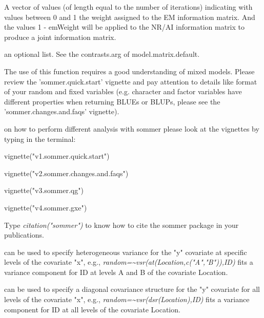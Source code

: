 \documentclass[a4paper]{book}
\begin{document}
\begin{Arguments}
\begin{ldescription}
\item[\code{emWeight}] A vector of values (of length equal to the number of iterations) indicating with values between 0 and 1 the weight assigned to the EM information matrix. And the values 1 - emWeight will be applied to the NR/AI information matrix to produce a joint information matrix.
\item[\code{contrasts}] an optional list. See the contrasts.arg of model.matrix.default.

\end{ldescription}
\end{Arguments}
%
\begin{Details}\relax

The use of this function requires a good understanding of mixed models. Please review the 'sommer.quick.start' vignette and pay attention to details like format of your random and fixed variables (e.g. character and factor variables have different properties when returning BLUEs or BLUPs, please see the 'sommer.changes.and.faqs' vignette). 

 on how to perform different analysis with sommer please look at the vignettes by typing in the terminal:

vignette("v1.sommer.quick.start")

vignette("v2.sommer.changes.and.faqs")

vignette("v3.sommer.qg")

vignette("v4.sommer.gxe")



Type \emph{citation("sommer")} to know how to cite the sommer package in your publications. 



can be used to specify heterogeneous variance for the "y" covariate at specific levels of the covariate "x", e.g., \emph{random=\textasciitilde{}vsr(at(Location,c("A","B")),ID)} fits a variance component for ID at levels A and B of the covariate Location.


can be used to specify a diagonal covariance structure for the "y" covariate for all levels of the covariate "x", e.g., \emph{random=\textasciitilde{}vsr(dsr(Location),ID)}  fits a variance component for ID at all levels of the covariate Location.


\end{Details}
\end{document}
